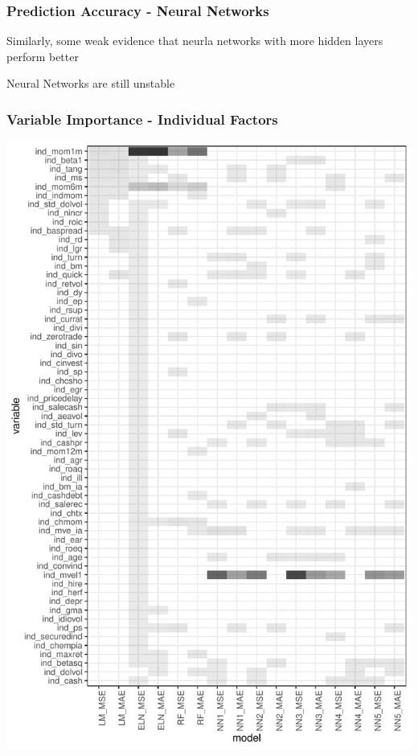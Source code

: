 \documentclass[aspectratio=169]{beamer}
\begin{document}
\begin{frame}
\frametitle{Prediction Accuracy - Neural Networks}
Similarly, some weak evidence that neurla networks with more hidden layers perform better

Neural Networks are still unstable
\end{frame}


\begin{frame}
\frametitle{Variable Importance - Individual Factors}
\includegraphics{empirical_sample_all_vi_ind.pdf}
\end{frame}
\end{document}
